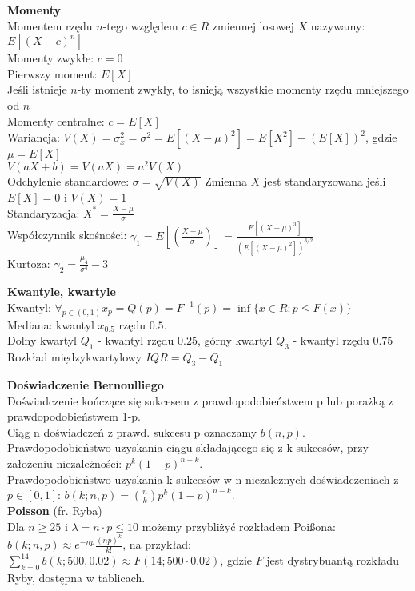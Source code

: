 \documentclass[10pt,landscape,a4paper,notitlepage]{article}
\begin{document}
\begin{multicols*}{4}
        \noindent\textbf{\large Momenty}\\
        Momentem rzędu $n$-tego względem $c\in R$ zmiennej losowej $X$ nazywamy: $E[(X-c)^n]$\\
        Momenty zwykłe: $c=0$\\
        Pierwszy moment: $E[X]$\\
        Jeśli istnieje $n$-ty moment zwykły, to isnieją wszystkie momenty rzędu mniejszego od $n$\\
        Momenty centralne: $c=E[X]$\\
        Wariancja: $V(X)=\sigma_x^2=\sigma^2=E[(X-\mu)^2]=E[X^2]-(E[X])^2$, gdzie $\mu=E[X]$\\
        $V(aX+b)=V(aX)=a^2V(X)$\\
        Odchylenie standardowe: $\sigma=\sqrt{V(X)}$
        Zmienna $X$ jest standaryzowana jeśli $E[X]=0$ i $V(X)=1$\\
        Standaryzacja: $X^*=\frac{X-\mu}{\sigma}$\\
        Współczynnik skośności: $\gamma_1=E\left[\left(\frac{X-\mu}{\sigma}\right)\right]=\frac{E[(X-\mu)^3]}{(E[(X-\mu)^2])^{3/2}}$\\
        Kurtoza: $\gamma_2=\frac{\mu_4}{\sigma^4}-3$

        \noindent\textbf{\large Kwantyle, kwartyle}\\
        Kwantyl: $\forall_{p\in(0,1)} x_p=Q(p)=F^{-1}(p)=\inf \{x\in R:p\leq F(x)\}$\\
        Mediana: kwantyl $x_0.5$ rzędu $0.5$.\\
        Dolny kwartyl $Q_1$ - kwantyl rzędu $0.25$, górny kwartyl $Q_3$ - kwantyl rzędu $0.75$\\
        Rozkład międzykwartylowy $IQR=Q_3-Q_1$

        \noindent \textbf{\large Doświadczenie Bernoulliego}\\
        Doświadczenie kończące się sukcesem z prawdopodobieństwem p lub porażką z prawdopodobieństwem 1-p.\\
        Ciąg n doświadczeń z prawd. sukcesu p oznaczamy $b(n,p)$.\\
        Prawdopodobieństwo uzyskania ciągu składającego się z k sukcesów, przy założeniu niezależności: $p^k(1-p)^{n-k}$.\\
        Prawdopodobieństwo uzyskania k sukcesów w n niezależnych doświadczeniach z $p\in[0,1]$: $b(k;n,p)=\binom{n}{k}p^k(1-p)^{n-k}$.\\
        \textbf{Poisson} (fr. Ryba)\\
        Dla $n\geq25$ i $\lambda = n\cdot p \leq10$ możemy przybliżyć rozkładem Poi\ss ona: $b(k;n,p)\approx e^{-np}\frac{(np)^k}{k!}$, na przykład:\\
        $\sum_{k=0}^{14}b(k;500,0.02)\approx F(14;500\cdot0.02)$, gdzie $F$ jest dystrybuantą rozkładu Ryby, dostępna w tablicach.


\end{multicols*}
\end{document}
